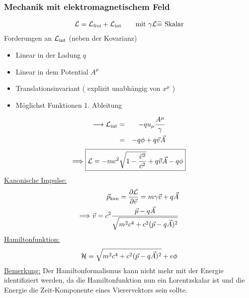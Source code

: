 \subsubsection{Mechanik mit elektromagnetischem Feld}
\begin{eqnarray*} \mathcal L = \mathcal L_{\text{frei}} + \mathcal L_{\text{int}} \qquad \text{mit  }\gamma\mathcal L \widehat = \text{  Skalar}\end{eqnarray*}
Forderungen an $\mathcal L_{\text{int}}$ (neben der Kovarianz)
\begin{itemize}
\item Linear in der Ladung $q$
\item Linear in dem Potential $A^{\mu}$
\item Translationsinvariant ( explizit unabhängig von $x^{\mu}$ )
\item Möglichst Funktionen 1. Ableitung
\end{itemize}
\begin{eqnarray*}\longrightarrow \mathcal L_{\text{int}} &=& - q u_{\mu} \frac{A^{\mu}}{\gamma} \\
&=& - q \phi + q \vec v\vec A\\
\end{eqnarray*}
\begin{eqnarray*}
\Longrightarrow \boxed{ \mathcal L = -mc^2 \sqrt{1 - \frac{\vec v^2}{c^2}} + q \vec v\vec A - q \phi}
\end{eqnarray*}
\underline{Kanonische Impulse:}
\begin{eqnarray*}
\vec p_{\text{kan}} = \frac{\partial \mathcal L}{\partial \vec v} = m\gamma\vec v + q \vec A\\
\Longrightarrow \vec v = c ^2\frac{\vec p - q \vec A}{\sqrt{m^2c^4 + c^2(\vec p - q\vec A)^2}}
\end{eqnarray*}
\underline{Hamiltonfunktion:}
\begin{eqnarray*}
\mathcal H = \sqrt{m^2c^4 + c^2(\vec p-q\vec A)^2} + e\phi \end{eqnarray*}
\underline{Bemerkung:} \babsatz Der Hamiltonformalismus kann nicht mehr mit der Energie identifiziert werden, da die Hamiltonfunktion nun ein Lorentzskalar ist und die Energie die Zeit-Komponente eines Vierervektors sein sollte.\eabsatz \vspace{0.5cm}

